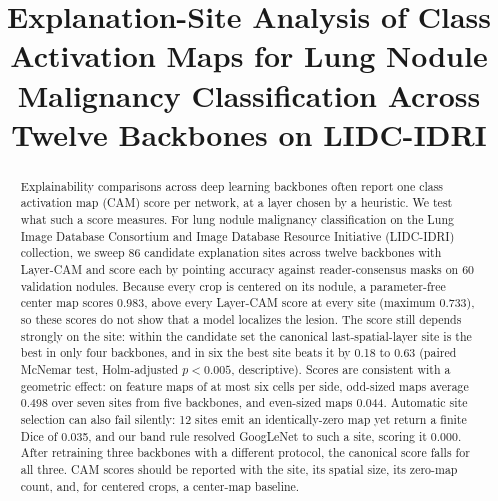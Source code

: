 \documentclass[conference]{IEEEtran}
\begin{document}
\title{Explanation-Site Analysis of Class Activation Maps for Lung Nodule Malignancy Classification Across Twelve Backbones on LIDC-IDRI}

\author{
\and
{}
\and
{}
}

\maketitle

\begin{abstract}
Explainability comparisons across deep learning backbones often report one class activation map (CAM) score per network, at a layer chosen by a heuristic. We test what such a score measures. For lung nodule malignancy classification on the Lung Image Database Consortium and Image Database Resource Initiative (LIDC-IDRI) collection, we sweep 86 candidate explanation sites across twelve backbones with Layer-CAM and score each by pointing accuracy against reader-consensus masks on 60 validation nodules. Because every crop is centered on its nodule, a parameter-free center map scores 0.983, above every Layer-CAM score at every site (maximum 0.733), so these scores do not show that a model localizes the lesion. The score still depends strongly on the site: within the candidate set the canonical last-spatial-layer site is the best in only four backbones, and in six the best site beats it by 0.18 to 0.63 (paired McNemar test, Holm-adjusted $p<0.005$, descriptive). Scores are consistent with a geometric effect: on feature maps of at most six cells per side, odd-sized maps average 0.498 over seven sites from five backbones, and even-sized maps 0.044. Automatic site selection can also fail silently: 12 sites emit an identically-zero map yet return a finite Dice of 0.035, and our band rule resolved GoogLeNet to such a site, scoring it 0.000. After retraining three backbones with a different protocol, the canonical score falls for all three. CAM scores should be reported with the site, its spatial size, its zero-map count, and, for centered crops, a center-map baseline.
\end{abstract}
\end{document}
